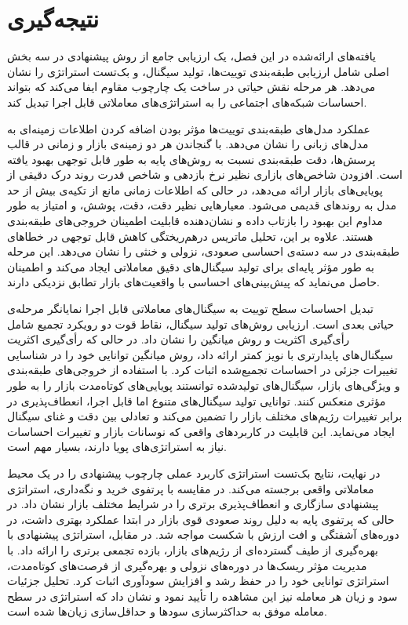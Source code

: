 \section*{نتیجه‌گیری}

یافته‌های ارائه‌شده در این فصل، یک ارزیابی جامع از روش پیشنهادی در سه بخش اصلی شامل ارزیابی طبقه‌بندی توییت‌ها، تولید سیگنال، و بک‌تست استراتژی را نشان می‌دهد. هر مرحله نقش حیاتی در ساخت یک چارچوب مقاوم ایفا می‌کند که بتواند احساسات شبکه‌های اجتماعی را به استراتژی‌های معاملاتی قابل اجرا تبدیل کند.

عملکرد مدل‌های طبقه‌بندی توییت‌ها مؤثر بودن اضافه کردن اطلاعات زمینه‌ای به مدل‌های زبانی را نشان می‌دهد. با گنجاندن هر دو زمینه‌ی بازار و زمانی در قالب پرسش‌ها، دقت طبقه‌بندی نسبت به روش‌های پایه به طور قابل توجهی بهبود یافته است. افزودن شاخص‌های بازاری نظیر نرخ بازدهی و شاخص قدرت روند درک دقیقی از پویایی‌های بازار ارائه می‌دهد، در حالی که اطلاعات زمانی مانع از تکیه‌ی بیش از حد مدل به روندهای قدیمی می‌شود. معیارهایی نظیر دقت، دقت، پوشش، و امتیاز   به طور مداوم این بهبود را بازتاب داده و نشان‌دهنده قابلیت اطمینان خروجی‌های طبقه‌بندی هستند. علاوه بر این، تحلیل ماتریس درهم‌ریختگی کاهش قابل توجهی در خطاهای طبقه‌بندی در سه دسته‌ی احساسی صعودی، نزولی و خنثی را نشان می‌دهد. این مرحله به طور مؤثر پایه‌ای برای تولید سیگنال‌های دقیق معاملاتی ایجاد می‌کند و اطمینان حاصل می‌نماید که پیش‌بینی‌های احساسی با واقعیت‌های بازار تطابق نزدیکی دارند.

تبدیل احساسات سطح توییت به سیگنال‌های معاملاتی قابل اجرا نمایانگر مرحله‌ی حیاتی بعدی است. ارزیابی روش‌های تولید سیگنال، نقاط قوت دو رویکرد تجمیع شامل رأی‌گیری اکثریت و روش میانگین را نشان داد. در حالی که رأی‌گیری اکثریت سیگنال‌های پایدارتری با نویز کمتر ارائه داد، روش میانگین توانایی خود را در شناسایی تغییرات جزئی در احساسات تجمیع‌شده اثبات کرد. با استفاده از خروجی‌های طبقه‌بندی و ویژگی‌های بازار، سیگنال‌های تولیدشده توانستند پویایی‌های کوتاه‌مدت بازار را به طور مؤثری منعکس کنند. توانایی تولید سیگنال‌های متنوع اما قابل اجرا، انعطاف‌پذیری در برابر تغییرات رژیم‌های مختلف بازار را تضمین می‌کند و تعادلی بین دقت و غنای سیگنال ایجاد می‌نماید. این قابلیت در کاربردهای واقعی که نوسانات بازار و تغییرات احساسات نیاز به استراتژی‌های پویا دارند، بسیار مهم است.

در نهایت، نتایج بک‌تست استراتژی کاربرد عملی چارچوب پیشنهادی را در یک محیط معاملاتی واقعی برجسته می‌کند. در مقایسه با پرتفوی خرید و نگه‌داری، استراتژی پیشنهادی سازگاری و انعطاف‌پذیری برتری را در شرایط مختلف بازار نشان داد. در حالی که پرتفوی پایه به دلیل روند صعودی قوی بازار در ابتدا عملکرد بهتری داشت، در دوره‌های آشفتگی و افت ارزش با شکست مواجه شد. در مقابل، استراتژی پیشنهادی با بهره‌گیری از طیف گسترده‌ای از رژیم‌های بازار، بازده تجمعی برتری را ارائه داد. با مدیریت مؤثر ریسک‌ها در دوره‌های نزولی و بهره‌گیری از فرصت‌های کوتاه‌مدت، استراتژی توانایی خود را در حفظ رشد و افزایش سودآوری اثبات کرد. تحلیل جزئیات سود و زیان هر معامله نیز این مشاهده را تأیید نمود و نشان داد که استراتژی در سطح معامله موفق به حداکثرسازی سودها و حداقل‌سازی زیان‌ها شده است.

